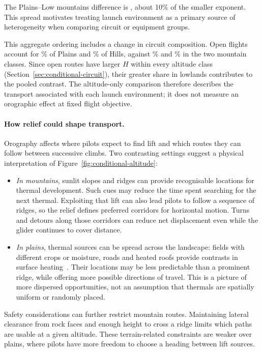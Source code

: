 The Plains--Low mountains difference is \CondAltZeroAltTwoDelta{}, about 10\%
of the smaller exponent. This spread motivates treating launch environment as
a primary source of heterogeneity when comparing circuit or equipment groups.

This aggregate ordering includes a change in circuit composition. Open flights
account for \ChThreeConditionalPlainsOpenPct\% of Plains and
\ChThreeConditionalHillsOpenPct\% of Hills, against
\ChThreeConditionalLowMountainsOpenPct\% and
\ChThreeConditionalHighMountainsOpenPct\% in the two mountain classes.
Since open routes have larger $H$ within every altitude class
(Section~\ref{sec:conditional-circuit}), their greater share
in lowlands contributes to the pooled contrast. The altitude-only comparison
therefore describes the transport associated with each launch environment; it
does not measure an orographic effect at fixed flight objective.

\paragraph{How relief could shape transport.}
Orography affects where pilots expect to find lift and which routes they can
follow between successive climbs. Two contrasting settings suggest a physical
interpretation of Figure~\ref{fig:conditional-altitude}:
\begin{itemize}
 \item \emph{In mountains}, sunlit slopes and ridges can provide recognisable
 locations for thermal development. Such cues may reduce the time spent searching
 for the next thermal. Exploiting that lift can also lead pilots to follow a
 sequence of ridges, so the relief defines preferred corridors for horizontal
 motion. Turns and detours along those corridors can reduce net displacement
 even while the glider continues to cover distance.
 \item \emph{In plains}, thermal sources can be spread across the landscape:
 fields with different crops or moisture, roads and heated roofs provide contrasts
 in surface heating~\cite{faa_glider2024}. Their locations may be less predictable
 than a prominent ridge, while offering more possible directions of travel.
 This is a picture of more dispersed opportunities, not an assumption that
 thermals are spatially uniform or randomly placed.
\end{itemize}

Safety considerations can further restrict mountain routes. Maintaining lateral
clearance from rock faces and enough height to cross a ridge limits which paths
are usable at a given altitude. These terrain-related constraints are weaker over
plains, where pilots have more freedom to choose a heading between lift sources.


